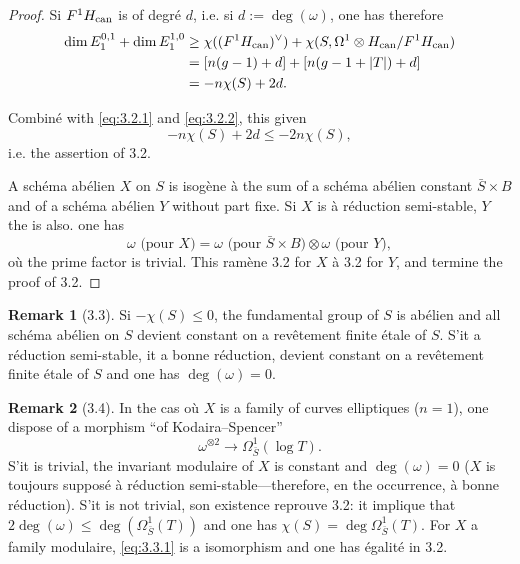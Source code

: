\documentclass[12pt,a4paper]{article}
\theoremstyle{plain}
\theoremstyle{definition}
\newtheorem{remark}{Remark}[section]
\newcommand{\can}{\textup{can}}
\begin{document}
{\begin{proof}
Si $F^{1}H_{\can}$ is of degr\'{e} $d$, i.e. si $d := \deg(\omega)$, one has therefore
\begin{align*}
\dim E_{1}^{0,1} + \dim E_{1}^{1,0} &\geq \chi((F^{1}H_{\can})^{\vee}) + \chi(S, \Omega^{1} \otimes H_{\can}/F^{1}H_{\can}) \\
&= [n(g-1) + d] + [n(g-1+|T|) + d] \\
&= -n\chi(S) + 2d.
\end{align*}

Combin\'{e} with \eqref{eq:3.2.1} and \eqref{eq:3.2.2}, this given
\[
-n\chi(S) + 2d \leq -2n\chi(S),
\]
i.e. the assertion of 3.2.

A sch\'{e}ma ab\'{e}lien $X$ on $S$ is isog\`{e}ne \`{a} the sum of a sch\'{e}ma ab\'{e}lien constant $\bar{S} \times B$ and of a sch\'{e}ma ab\'{e}lien $Y$ without part fixe. Si $X$ is \`{a} r\'{e}duction semi-stable, $Y$ the is also. one has
\[
\omega \text{ (pour } X) = \omega \text{ (pour } \bar{S} \times B) \otimes \omega \text{ (pour } Y),
\]
o\`{u} the prime factor is trivial. This ram\`{e}ne 3.2 for $X$ \`{a} 3.2 for $Y$, and termine the proof of 3.2.
\end{proof}

\begin{remark}[3.3]
Si $-\chi(S) \leq 0$, the fundamental group of $S$ is ab\'{e}lien and all sch\'{e}ma ab\'{e}lien on $S$ devient constant on a rev\^{e}tement finite \'{e}tale of $S$. S'it a r\'{e}duction semi-stable, it a bonne r\'{e}duction, devient constant on a rev\^{e}tement finite \'{e}tale of $S$ and one has $\deg(\omega) = 0$.
\end{remark}

\begin{remark}[3.4]
In the cas o\`{u} $X$ is a family of curves elliptiques ($n=1$), one dispose of a morphism ``of Kodaira--Spencer''
\begin{equation}\label{eq:3.3.1}
\omega^{\otimes 2} \to \Omega^{1}_{\bar{S}}(\log T).
\end{equation}
S'it is trivial, the invariant modulaire of $X$ is constant and $\deg(\omega) = 0$ ($X$ is toujours suppos\'{e} \`{a} r\'{e}duction semi-stable---therefore, en the occurrence, \`{a} bonne r\'{e}duction). S'it is not trivial, son existence reprouve 3.2: it implique that $2\deg(\omega) \leq \deg(\Omega^{1}_{\bar{S}}(T))$ and one has $\chi(S) = \deg \Omega^{1}_{\bar{S}}(T)$. For $X$ a family modulaire, \eqref{eq:3.3.1} is a isomorphism and one has \'{e}galit\'{e} in 3.2.
\end{remark}

}
\end{document}
